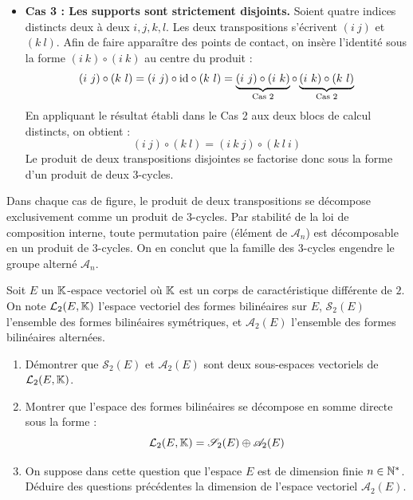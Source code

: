 \documentclass[12pt, a4paper]{report}
\begin{document}
\begin{enumerate}
\begin{itemize}
        \item \textbf{Cas 3 : Les supports sont strictement disjoints.} Soient quatre indices distincts deux à deux $i, j, k, l$. Les deux transpositions s'écrivent $(i \ j)$ et $(k \ l)$. Afin de faire apparaître des points de contact, on insère l'identité sous la forme $(i \ k) \circ (i \ k)$ au centre du produit :
        $$(i \ j) \circ (k \ l) = (i \ j) \circ \Id \circ (k \ l) = \underbrace{(i \ j) \circ (i \ k)}_{\text{Cas 2}} \circ \underbrace{(i \ k) \circ (k \ l)}_{\text{Cas 2}}$$
        En appliquant le résultat établi dans le Cas 2 aux deux blocs de calcul distincts, on obtient :
        $$(i \ j) \circ (k \ l) = (i \ k \ j) \circ (k \ l \ i)$$
        Le produit de deux transpositions disjointes se factorise donc sous la forme d'un produit de deux $3$-cycles.
    \end{itemize}
    Dans chaque cas de figure, le produit de deux transpositions se décompose exclusivement comme un produit de $3$-cycles. Par stabilité de la loi de composition interne, toute permutation paire (élément de $\mathcal{A}_n$) est décomposable en un produit de $3$-cycles. On en conclut que la famille des $3$-cycles engendre le groupe alterné $\mathcal{A}_n$.
\end{enumerate}

\begin{exercise}
    Soit $E$ un $\mathbb{K}$-espace vectoriel où $\mathbb{K}$ est un corps de caractéristique différente de $2$. On note $\mathcal{L}_2(E, \mathbb{K})$ l'espace vectoriel des formes bilinéaires sur $E$, $\mathscr{S}_2(E)$ l'ensemble des formes bilinéaires symétriques, et $\mathscr{A}_2(E)$ l'ensemble des formes bilinéaires alternées.
    
    \begin{enumerate}
        \item Démontrer que $\mathscr{S}_2(E)$ et $\mathscr{A}_2(E)$ sont deux sous-espaces vectoriels de $\mathcal{L}_2(E, \mathbb{K})$.
        \item Montrer que l'espace des formes bilinéaires se décompose en somme directe sous la forme :
        $$\mathcal{L}_2(E, \mathbb{K}) = \mathscr{S}_2(E) \oplus \mathscr{A}_2(E)$$
        \item On suppose dans cette question que l'espace $E$ est de dimension finie $n \in \mathbb{N}^*$. Déduire des questions précédentes la dimension de l'espace vectoriel $\mathscr{A}_2(E)$.
    \end{enumerate}
\end{exercise}
\end{document}
